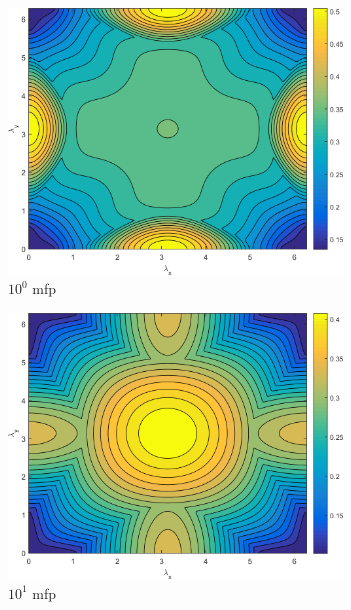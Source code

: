\begin{figure}
	{
	\begin{subfigure}[b]{0.485\textwidth}
		\centering
		\includegraphics[width=0.975\textwidth]{figures/appendices/SI_M4S_UPWLD1_LS4_x=1_dydx=1_contour.png}
		\caption{$10^{0}$ mfp}
	\end{subfigure}
	\hfill
	\begin{subfigure}[b]{0.485\textwidth}
		\centering
		\includegraphics[width=0.975\textwidth]{figures/appendices/SI_M4S_UPWLD1_LS4_x=10_dydx=1_contour.png}
		\caption{$10^{1}$ mfp}
	\end{subfigure}
	}
	\vspace{0.5cm}
	{
	\begin{subfigure}[b]{0.485\textwidth}

\end{subfigure}}
\end{figure}

